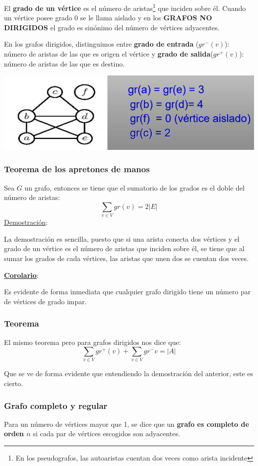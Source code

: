 \documentclass[10pt,a4paper,openright]{book}
\begin{document}
El \textbf{grado de un vértice} es el número de aristas\footnote{En los pseudografos, las autoaristas cuentan dos veces como arista incidente} que inciden sobre él. Cuando un vértice posee grado 0 se le llama aislado y en los \textbf{GRAFOS NO DIRIGIDOS} el grado es sinónimo del número de vértices adyacentes.

En los grafos dirigidos, distinguimos entre \textbf{grado de entrada} ($gr^-(v)$): número de aristas de las que es origen el vértice y \textbf{grado de salida}($gr^+(v)$): número de aristas de las que es destino.

\begin{center}
\includegraphics[scale=0.65]{adyacencia}
\end{center}

\subsubsection*{Teorema de los apretones de manos}
Sea $G$ un grafo, entonces se tiene que el sumatorio de los grados es el doble del número de aristas:
$$\sum_{v\in V} gr(v)=2|E|$$
\underline{Demostración}:

La demostración es sencilla, puesto que si una arista conecta dos vértices y el grado de un vértice es el número de aristas que inciden sobre él, se tiene que al sumar los grados de cada vértices, las aristas que unen dos se cuentan dos veces.

\underline{\textbf{Corolario}}:

Es evidente de forma inmediata que cualquier grafo dirigido tiene un número par de vértices de grado impar.

\subsubsection*{Teorema}
El mismo teorema pero para grafos dirigidos nos dice que:
$$\sum_{v\in V}gr^+(v)+\sum_{v\in V}gr^-{v}=|A|$$

Que se ve de forma evidente que entendiendo la demostración del anterior, este es cierto.

\subsubsection*{Grafo completo y regular}
Para un número de vértices mayor que 1, se dice que un \textbf{grafo es completo de orden $n$} si cada par de vértices escogidos son adyacentes.
\end{document}
